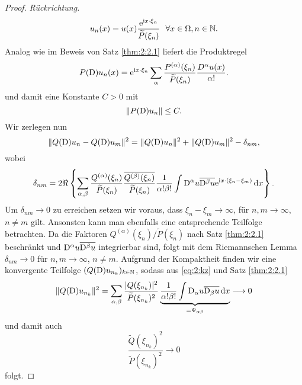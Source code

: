 \begin{proof} {\it Rückrichtung.}
\begin{equation}
u_n(x)=u(x)\frac{\mathrm e^{\mathrm i x \cdot \xi_n}}{\widetilde{P}(\xi_n)}\ \ \forall x \in \Omega, n \in \mathbb{N}.
\end{equation}
Analog wie im Beweis von Satz \ref{thm:2:2.1} liefert die Produktregel
\begin{equation}
P(\mathrm D)u_n(x)=\mathrm e^{\mathrm i x \cdot \xi_n}\sum_\alpha\frac{P^{(\alpha)}(\xi_n)}{\widetilde{P}(\xi_n)}\frac{D^\alpha u(x)}{\alpha!}.
\end{equation}
und damit eine Konstante $C>0$ mit
\begin{equation}\label{eq:2:PDunb}
\lVert P(\mathrm D)u_n\rVert\leq C.
\end{equation}
Wir zerlegen nun
\begin{equation}\label{eq:2:kz}
\lVert Q(\mathrm D)u_n-Q(\mathrm D)u_m\rVert^2=\lVert Q(\mathrm D)u_n\rVert^2+\lVert Q(\mathrm D)u_m\rVert^2-\delta_{nm},
\end{equation}
wobei
\begin{equation}
\delta_{nm}=2\Re\left\{\sum_{\alpha,\beta}\frac{Q^{(\alpha)}(\xi_n)}{\widetilde{P}(\xi_n)}\frac{\overline{Q^{(\beta)}(\xi_n)}}{\widetilde{P}(\xi_n)}
\frac1{\alpha!\beta!}\int \mathrm D^\alpha u\overline{\mathrm D^\beta u}\mathrm e^{\mathrm i x \cdot(\xi_n-\xi_m)}\,\mathrm d  x\right\}.
\end{equation}
Um $\delta_{nm}\to0$ zu erreichen setzen wir voraus, dass $\xi_n-\xi_m\to\infty$, für $n,m\to\infty$, $n\neq m$ gilt. Ansonsten kann man ebenfalls eine entsprechende Teilfolge betrachten.
Da die Faktoren $Q^{(\alpha)}(\xi_n)/\widetilde{P}(\xi_n)$ nach Satz \ref{thm:2:2.1} beschränkt und $\mathrm D^\alpha u\overline{\mathrm D^\beta u}$ integrierbar sind, folgt mit dem Riemannschen Lemma $\delta_{nm}\to0$ für $n,m\to\infty$, $n\neq m$.
Aufgrund der Kompaktheit finden wir eine konvergente Teilfolge $(Q(\mathrm D)u_{n_k})_{k \in \mathbb{N}}$, sodass aus \eqref{eq:2:kz} und Satz \ref{thm:2:2.1}
\begin{equation}
\lVert Q(\mathrm D)u_{n_k}\rVert^2=\sum_{\alpha,\beta}\frac{\lvert Q(\xi_{n_k})\rvert^2}{\widetilde{P}(\xi_{n_k})^2} \underbrace{\frac{1}{\alpha! \beta!}\int \mathrm D_\alpha u \overline{\mathrm D_\beta u} \,\mathrm d x}_{=\Psi_{\alpha \beta}} \longrightarrow 0
\end{equation}
und damit auch 
\begin{equation}
\frac{\widetilde{Q}(\xi_{n_k})^2}{\widetilde{P}(\xi_{n_k})^2} \longrightarrow 0
\end{equation}
folgt.
\end{proof}
